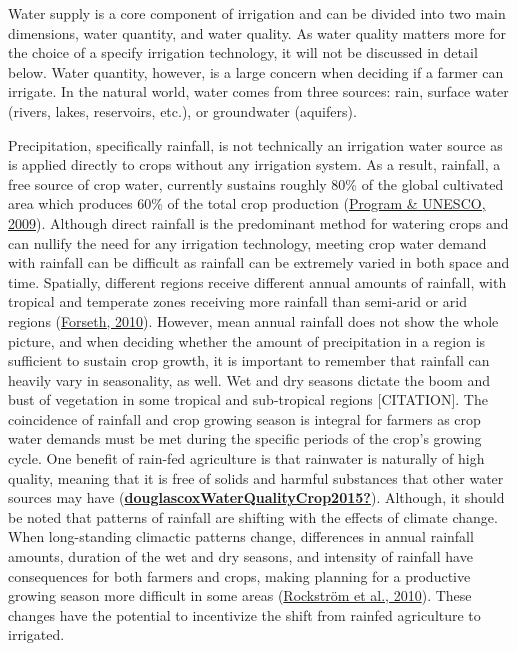 \documentclass[12pt,twoside]{reedthesis}
\begin{document}
Water supply is a core component of irrigation and can be divided into two main dimensions, water quantity, and water quality. As water quality matters more for the choice of a specify irrigation technology, it will not be discussed in detail below. Water quantity, however, is a large concern when deciding if a farmer can irrigate. In the natural world, water comes from three sources: rain, surface water (rivers, lakes, reservoirs, etc.), or groundwater (aquifers).

Precipitation, specifically rainfall, is not technically an irrigation water source as is applied directly to crops without any irrigation system. As a result, rainfall, a free source of crop water, currently sustains roughly 80\% of the global cultivated area which produces 60\% of the total crop production (\protect\hyperlink{ref-worldwaterassesnentprogramUnitedNationsWorld2009}{Program \& UNESCO, 2009}). Although direct rainfall is the predominant method for watering crops and can nullify the need for any irrigation technology, meeting crop water demand with rainfall can be difficult as rainfall can be extremely varied in both space and time. Spatially, different regions receive different annual amounts of rainfall, with tropical and temperate zones receiving more rainfall than semi-arid or arid regions (\protect\hyperlink{ref-forsethTerrestrialBiomes2010}{Forseth, 2010}). However, mean annual rainfall does not show the whole picture, and when deciding whether the amount of precipitation in a region is sufficient to sustain crop growth, it is important to remember that rainfall can heavily vary in seasonality, as well. Wet and dry seasons dictate the boom and bust of vegetation in some tropical and sub-tropical regions {[}CITATION{]}. The coincidence of rainfall and crop growing season is integral for farmers as crop water demands must be met during the specific periods of the crop's growing cycle. One benefit of rain-fed agriculture is that rainwater is naturally of high quality, meaning that it is free of solids and harmful substances that other water sources may have (\protect\hyperlink{ref-douglascoxWaterQualityCrop2015}{\textbf{douglascoxWaterQualityCrop2015?}}). Although, it should be noted that patterns of rainfall are shifting with the effects of climate change. When long-standing climactic patterns change, differences in annual rainfall amounts, duration of the wet and dry seasons, and intensity of rainfall have consequences for both farmers and crops, making planning for a productive growing season more difficult in some areas (\protect\hyperlink{ref-rockstromManagingWaterRainfed2010}{Rockström et al., 2010}). These changes have the potential to incentivize the shift from rainfed agriculture to irrigated.
\end{document}
